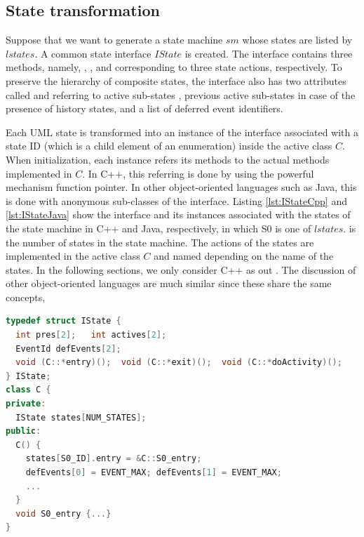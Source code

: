 \subsection{State transformation}
Suppose that we want to generate a state machine $sm$ whose states are listed by $lstates$. A common state interface $IState$ is created. The interface contains three methods, namely, , , and  corresponding to three state actions, respectively. To preserve the hierarchy of composite states, the interface also has two attributes called  and  referring to active sub-states  , previous active sub-states  in case of the presence of history states, and a list of deferred event identifiers.

Each UML state is transformed into an instance of the interface associated with a state ID (which is a child element of an enumeration) inside the active class $C$. When initialization, each instance refers its methods to the actual methods implemented in $C$. In C++, this referring is done by using the powerful mechanism function pointer. In other object-oriented languages such as Java, this is done with anonymous sub-classes of the interface. Listing \ref{lst:IStateCpp} and \ref{lst:IStateJava} show the interface and its instances associated with the states of the state machine in C++ and Java, respectively, in which S0 is one of $lstates$.  is the number of states in the state machine. The actions of the states are implemented in the active class $C$ and named depending on the name of the states. In the following sections, we only consider C++ as out . The discussion of other object-oriented languages are much similar since these share the same concepts,  

\begin{lstlisting}[caption=IState interface and function pointers in C++, label=lst:IStateCpp, frame=single, language=C++]
typedef struct IState {
  int pres[2];   int actives[2];
  EventId defEvents[2];
  void (C::*entry)();  void (C::*exit)();  void (C::*doActivity)();
} IState;
class C {
private:
  IState states[NUM_STATES];
public:
  C() {
    states[S0_ID].entry = &C::S0_entry;
    defEvents[0] = EVENT_MAX; defEvents[1] = EVENT_MAX;
    ...
  }
  void S0_entry {...}
}
\end{lstlisting}

